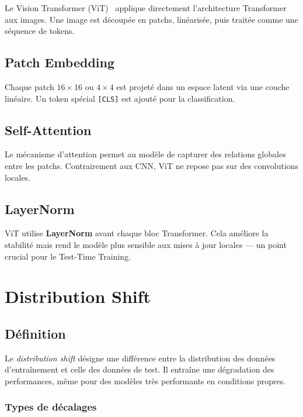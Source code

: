 \documentclass[12pt,a4paper]{report}
\begin{document}
	Le Vision Transformer (ViT)~\cite{Dosovitskiy2021} applique directement l’architecture Transformer aux images.  
	Une image est découpée en patchs, linéarisée, puis traitée comme une séquence de tokens.
	
	\subsection{Patch Embedding}
	
	Chaque patch $16\times16$ ou $4\times4$ est projeté dans un espace latent via une couche linéaire.  
	Un token spécial \texttt{[CLS]} est ajouté pour la classification.
	
	\subsection{Self-Attention}
	
	Le mécanisme d’attention permet au modèle de capturer des relations globales entre les patchs.  
	Contrairement aux CNN, ViT ne repose pas sur des convolutions locales.
	
	\subsection{LayerNorm}
	
	ViT utilise \textbf{LayerNorm} avant chaque bloc Transformer.  
	Cela améliore la stabilité mais rend le modèle plus sensible aux mises à jour locales — un point crucial pour le Test-Time Training.
	
	\section{Distribution Shift}
	
	\subsection{Définition}
	
	Le \emph{distribution shift} désigne une différence entre la distribution des données d’entraînement et celle des données de test.  
	Il entraîne une dégradation des performances, même pour des modèles très performants en conditions propres.
	
	\subsubsection{Types de décalages}
	
\end{document}
